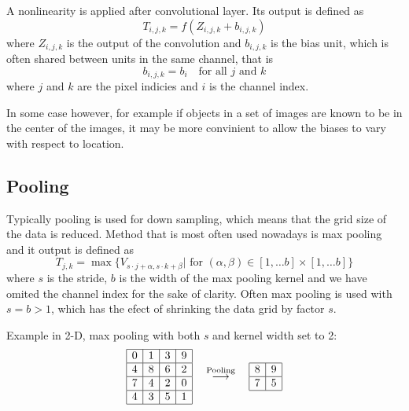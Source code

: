 \documentclass[]{article}
\begin{document}
A nonlinearity is applied after convolutional layer. Its output is defined as
\[
T_{i,j,k} = f(Z_{i, j, k} + b_{i,j,k})
\]
where $Z_{i, j, k}$ is the output of the convolution and $b_{i, j, k}$ is the bias
unit, which is often shared between units in the same channel, that is
\[
b_{i, j, k} = b_i \quad \text{for all $j$ and $k$}
\]
where $j$ and $k$ are the pixel indicies and $i$ is the channel index.

In some case however, for example if objects in a set of images are known to be
in the center of the images, it may be more convinient to allow the biases to vary
with respect to location.

\subsection{Pooling}
Typically pooling is used for down sampling, which means that the grid size of
the data is reduced. Method that is most often used nowadays is max pooling and
it output is defined as
\[
T_{j,k} = \max \{V_{s \cdot j + \alpha, s \cdot k + \beta} |
\text{ for $(\alpha, \beta) \in [1,\ldots b] \times  [1,\ldots b]$} \}
\]
where $s$ is the stride, $b$ is the width of the max pooling kernel and we have
omited the channel index for the sake of clarity. Often max pooling is used with
$s = b > 1$, which has the efect of shrinking the data grid by factor $s$.

Example in 2-D, max pooling with both $s$ and kernel width set to 2:
\[
\begin{array}{|c|c|c|c|}
  \hline
  0 & 1 & 3 & 9\\
  \hline
  4 & 8 & 6 & 2\\
  \hline
  7 & 4 & 2 & 0\\
  \hline
  4 & 3 & 5 & 1\\
  \hline
 \end{array}
 \quad \stackrel{\text{Pooling}}{\longrightarrow} \quad
 \begin{array}{|c|c|}
   \hline
   8 & 9\\
   \hline
   7 & 5\\
   \hline
  \end{array}
 \]

\end{document}
